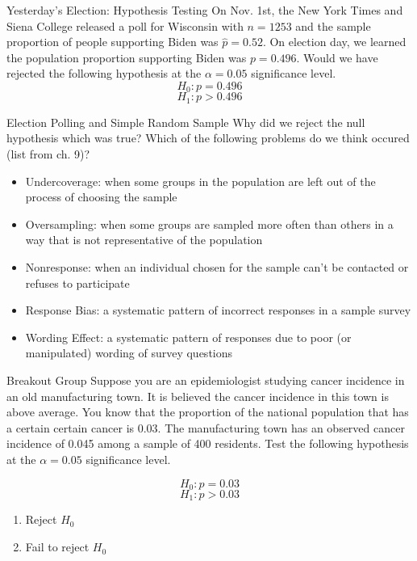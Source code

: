 \documentclass{beamer}
\begin{document}
\begin{frame}{Yesterday's Election: Hypothesis Testing}	
	On Nov. 1st, the New York Times and Siena College released a poll for Wisconsin with $n = 1253$ and the sample proportion of people supporting Biden was $\hat{p} = 0.52$. On election day, we learned the population proportion supporting Biden was $p = 0.496$. Would we have rejected the following hypothesis at the $\alpha = 0.05$ significance level.
	\[ 
		H_0: p = 0.496
	\]
	\[ 
		H_1: p > 0.496
	\]
\end{frame}

\frame

\begin{frame}{Election Polling and Simple Random Sample}	
	Why did we reject the null hypothesis which was true? Which of the following problems do we think occured (list from ch. 9)?

	\begin{itemize}
		\item \alert{Undercoverage}: when some groups in the population are left out of the process of choosing the sample
		\item \alert{Oversampling}: when some groups are sampled more often than others in a way that is not representative of the population
		\item \alert{Nonresponse}: when an individual chosen for the sample can't be contacted or refuses to participate
		\item \alert{Response Bias}: a systematic pattern of incorrect responses in a sample survey
		\item \alert{Wording Effect}: a systematic pattern of responses due to poor (or manipulated) wording of survey questions
	\end{itemize}
\end{frame}


\begin{frame}{Breakout Group}
	Suppose you are an epidemiologist studying cancer incidence in an old manufacturing town. It is believed the cancer incidence in this town is above average. You know that the proportion of the national population that has a certain certain cancer is 0.03. The manufacturing town has an observed cancer incidence of 0.045 among a sample of 400 residents. Test the following hypothesis at the $\alpha = 0.05$ significance level.
	
	\[ 
		H_0: p = 0.03
	\]
	\[ 
		H_1: p > 0.03
	\]

	\begin{enumerate}[label=(\alph*)]
		\item Reject $H_0$
		\item Fail to reject $H_0$
	\end{enumerate}
\end{frame}
\end{document}
